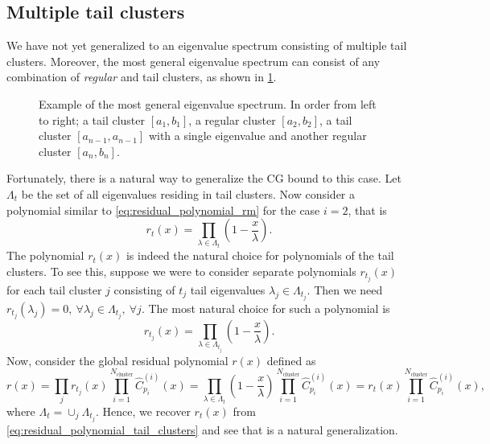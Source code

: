 \subsection{Multiple tail clusters}\label{sec:cg_single_eigenvalue_tail_clusters}
We have not yet generalized to an eigenvalue spectrum consisting of multiple tail clusters. Moreover, the most general eigenvalue spectrum can consist of any combination of \textit{regular} and tail clusters, as shown in \cref{fig:general_spectrum}.
\begin{figure}[H]
    \centering
    
    \caption{Example of the most general eigenvalue spectrum. In order from left to right; a tail cluster $[a_1, b_1]$, a regular cluster $[a_2, b_2]$, a tail cluster $[a_{n-1}, a_{n-1}]$ with a single eigenvalue and another regular cluster $[a_n, b_n]$.}
    \label{fig:general_spectrum}
\end{figure}

Fortunately, there is a natural way to generalize the CG bound to this case. Let $\Lambda_{t}$ be the set of all eigenvalues residing in tail clusters. Now consider a polynomial similar to \cref{eq:residual_polynomial_rm} for the case $i=2$, that is
\begin{equation}
    r_{t}(x) = \prod_{\lambda\in\Lambda_{t}} \left(1 - \frac{x}{\lambda}\right).
    \label{eq:residual_polynomial_tail_clusters}
\end{equation}
The polynomial $r_t(x)$ is indeed the natural choice for polynomials of the tail clusters. To see this, suppose we were to consider separate polynomials $r_{t_j}(x)$ for each tail cluster $j$ consisting of $t_j$ tail eigenvalues $\lambda_j\in\Lambda_{t_j}$. Then we need $r_{t_j}(\lambda_j) = 0, \ \forall \lambda_j \in \Lambda_{t_j}, \ \forall j$. The most natural choice for such a polynomial is
\begin{equation}
    r_{t_j}(x) = \prod_{\lambda\in\Lambda_{t_j}} \left(1 - \frac{x}{\lambda}\right).
\end{equation}
Now, consider the global residual polynomial $r(x)$ defined as
\begin{equation}
    r(x) = \prod_{j} r_{t_j}(x) \prod_{i=1}^{N_{\text{cluster}}} \hat{C}^{(i)}_{p_i}(x)= \prod_{\lambda\in\Lambda_{t}} \left(1 - \frac{x}{\lambda}\right)\prod_{i=1}^{N_{\text{cluster}}} \hat{C}^{(i)}_{p_i}(x) = r_t(x)\prod_{i=1}^{N_{\text{cluster}}} \hat{C}^{(i)}_{p_i}(x),
    \label{eq:residual_polynomial_tail_clusters_global}
\end{equation}
where $\Lambda_{t} = \cup_{j} \Lambda_{t_j}$. Hence, we recover $r_t(x)$ from \cref{eq:residual_polynomial_tail_clusters} and see that is a natural generalization.

